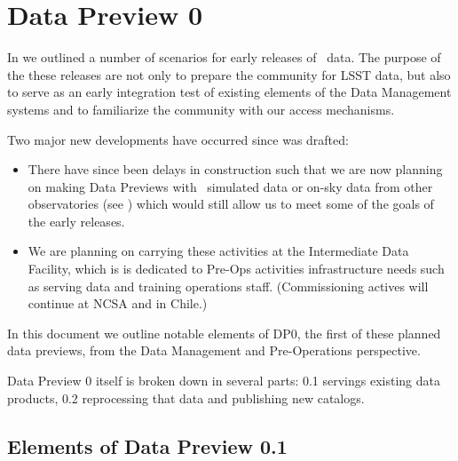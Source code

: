 \section{Data Preview 0}\label{sec:dp0}

In  we outlined a number of scenarios for early releases of \RO~data. The purpose of the these releases are not only to prepare the community for LSST data, but also to serve as an early integration test of existing elements of the Data Management systems and to familiarize the community with our access mechanisms.

Two major new developments have occurred since  was drafted:

\begin{itemize}

\item There have since been delays in construction such that we are now planning on making Data Previews with \RO~simulated data or on-sky data from other observatories (see ) which would still allow us to meet some of the goals of the early releases.

\item We are planning on carrying these activities at the Intermediate Data Facility, which is is dedicated to Pre-Ops activities infrastructure needs such as serving data and training operations staff. (Commissioning actives will continue at NCSA and in Chile.)

\end{itemize}

In this document we outline notable elements of DP0, the first of these planned data previews, from the Data Management and Pre-Operations perspective.

Data Preview 0 itself is broken down in several parts: 0.1 servings existing data products, 0.2 reprocessing that data and publishing new catalogs.

\subsection{Elements of Data Preview 0.1}


